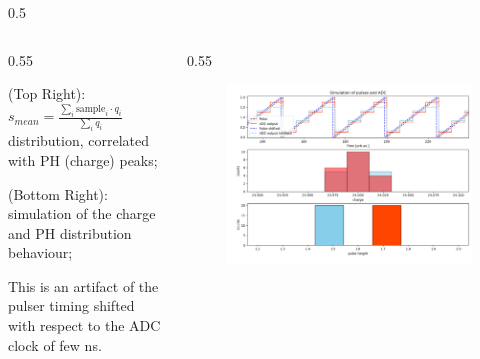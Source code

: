 \documentclass{beamer}
\begin{document}
\begin{frame}
\begin{columns}
\begin{column}{0.5\framewidth}
\begin{figure}[!h]
     \label{fig:normalhits}
\end{figure}
\end{column}
\end{columns}
\vspace{-5mm}
    \begin{columns}
    \begin{column}{0.55\framewidth}
        \setlength{\leftmargini}{1.em}
        \vspace{-2mm}
      \begin{itemize}
 {\small
\item (Top Right): $s_{mean} = \frac{\sum_i \text{sample}_i \cdot q_i }{\sum_i q_i} $ distribution, correlated with PH (charge) peaks;
\item (Bottom Right): simulation of the charge and PH distribution behaviour;
\item This is an artifact of the pulser 
timing shifted with respect to the ADC 
clock of few ns.}

\end{itemize}
\end{column}
\begin{column}{0.55\framewidth}
         \begin{figure}[!h]
      \centering
      \hspace*{-2em}
      \includegraphics[width=1.1\columnwidth]{figures/png/pres.png}
     \label{fig:normalhits}
\end{figure}
\end{column}
\end{columns}
\end{frame}
\end{document}

